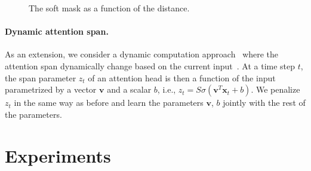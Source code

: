 \documentclass[11pt,a4paper]{article}
\begin{document}
\begin{figure}[t]
\centering
  \caption{The soft mask as a function of the distance.}
  \label{fig:ramp}
\end{figure}

\paragraph{Dynamic attention span.}
As an extension, we consider a dynamic computation approach~\citep{graves2016adaptive} where the attention span dynamically change based on the current input~\citep{Luong2015EffectiveAT,Shu2017AnES}.
At a time step $t$, the span parameter $z_t$ of an attention head is then a function of the input parametrized by a vector $\mathbf{v}$ and a scalar $b$, i.e., $z_t=S\sigma(\mathbf{v}^T\mathbf{x}_t+b)$.
We penalize $z_t$ in the same way as before and learn the parameters $\mathbf{v}$, $b$ jointly with the rest of the parameters.
 
\section{Experiments}
\end{document}
